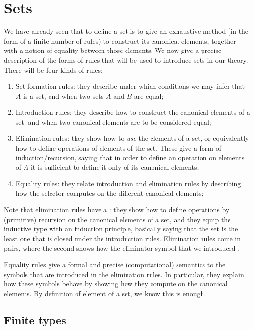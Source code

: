 \section{Sets}

We have already seen that to define a set is to give an exhaustive method (in
the form of a finite number of rules) to construct its canonical elements,
together with a notion of equality between those elements. We now give a precise
description of the forms of rules that will be used to introduce sets in our
theory. There will be four kinds of rules:

\begin{enumerate}
\item Set formation rules: they describe under which conditions we may infer
  that $A$ is a set, and when two sets $A$ and $B$ are equal;
\item Introduction rules: they describe how to construct the canonical elements
  of a set, and when two canonical elements are to be considered equal;
\item Elimination rules: they show how to \emph{use} the elements of a set, or
  equivalently how to define operations of elements of the set. These give a
  form of induction/recursion, saying that in order to define an operation on
  elements of $A$ it is sufficient to define it only of its canonical elements;
\item Equality rules: they relate introduction and elimination rules by
  describing how the selector computes on the different canonical elements;
\end{enumerate}

Note that elimination rules have a : they show how to
define operations by (primitive) recursion on the canonical elements of a set,
and they equip the inductive type with an induction principle, basically saying
that the set is the least one that is closed under the introduction rules.
Elimination rules come in pairs, where the second shows how the eliminator
symbol that we introduced .

Equality rules give a formal and precise (computational) semantics to the
symbols that are introduced in the elimination rules. In particular, they
explain how these symbols behave by showing how they compute on the canonical
elements. By definition of element of a set, we know this is enough.

\subsection{Finite types}

